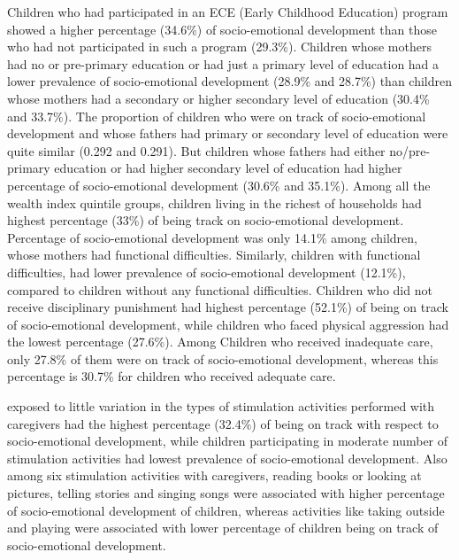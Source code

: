 \documentclass[
  12pt,
  oneside]{report}
\begin{document}
\normalsize

\vspace{10mm}

Children who had participated in an ECE (Early Childhood Education) program showed a higher percentage (34.6\%) of socio-emotional development than those who had not participated in such a program (29.3\%). Children whose mothers had no or pre-primary education or had just a primary level of education had a lower prevalence of socio-emotional development (28.9\% and 28.7\%) than children whose mothers had a secondary or higher secondary level of education (30.4\% and 33.7\%). The proportion of children who were on track of socio-emotional development and whose fathers had primary or secondary level of education were quite similar (0.292 and 0.291). But children whose fathers had either no/pre-primary education or had higher secondary level of education had higher percentage of socio-emotional development (30.6\% and 35.1\%). Among all the wealth index quintile groups, children living in the richest of households had highest percentage (33\%) of being track on socio-emotional development. Percentage of socio-emotional development was only 14.1\% among children, whose mothers had functional difficulties. Similarly, children with functional difficulties, had lower prevalence of socio-emotional development (12.1\%), compared to children without any functional difficulties. Children who did not receive disciplinary punishment had highest percentage (52.1\%) of being on track of socio-emotional development, while children who faced physical aggression had the lowest percentage (27.6\%). Among Children who received inadequate care, only 27.8\% of them were on track of socio-emotional development, whereas this percentage is 30.7\% for children who received adequate care.

exposed to little variation in the types of stimulation activities performed with caregivers had the highest percentage (32.4\%) of being on track with respect to socio-emotional development, while children participating in moderate number of stimulation activities had lowest prevalence of socio-emotional development. Also among six stimulation activities with caregivers, reading books or looking at pictures, telling stories and singing songs were associated with higher percentage of socio-emotional development of children, whereas activities like taking outside and playing were associated with lower percentage of children being on track of socio-emotional development.
\end{document}
